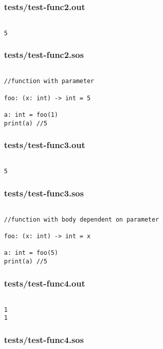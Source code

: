 \documentclass[main.tex]{subfiles}
\begin{document}
\subsubsection{tests/test-func2.out}

\begin{lstlisting}

5
\end{lstlisting}

\subsubsection{tests/test-func2.sos}

\begin{lstlisting}

//function with parameter

foo: (x: int) -> int = 5

a: int = foo(1)
print(a) //5
\end{lstlisting}

\subsubsection{tests/test-func3.out}

\begin{lstlisting}

5
\end{lstlisting}

\subsubsection{tests/test-func3.sos}

\begin{lstlisting}

//function with body dependent on parameter

foo: (x: int) -> int = x

a: int = foo(5)
print(a) //5
\end{lstlisting}

\subsubsection{tests/test-func4.out}

\begin{lstlisting}

1
1
\end{lstlisting}

\subsubsection{tests/test-func4.sos}
\end{document}
